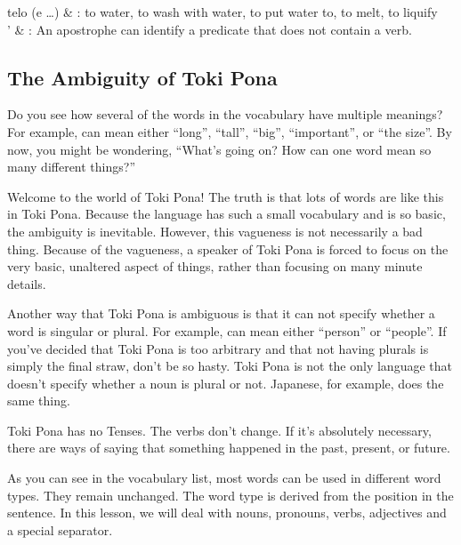 \begin{vocabularytable}
    telo (e \dots{})   & : to water, to wash with water, to put water to, to melt, to liquify                                                                                    \\
    \wordrule %
    '                  & : An apostrophe can identify a predicate that does not contain a verb.                                                                                       \\
\end{vocabularytable}

\subsection*{The Ambiguity of Toki Pona}
Do you see how several of the words in the vocabulary have multiple meanings?
For example,  can mean either ``long'', ``tall'', ``big'', ``important'', or ``the size''.
By now, you might be wondering, ``What's going on? How can one word mean so many different things?''

Welcome to the world of Toki Pona!
The truth is that lots of words are like this in Toki Pona.
Because the language has such a small vocabulary and is so basic, the ambiguity is inevitable.
However, this vagueness is not necessarily a bad thing. Because of the vagueness, a speaker of Toki Pona is forced to focus on the very basic, unaltered aspect of things, rather than focusing on many minute details.

Another way that Toki Pona is ambiguous is that it can not specify whether a word is singular or plural.
For example,  can mean either ``person'' or ``people''.
If you've decided that Toki Pona is too arbitrary and that not having plurals is simply the final straw, don't be so hasty.
Toki Pona is not the only language that doesn't specify whether a noun is plural or not.
Japanese, for example, does the same thing.

Toki Pona has no Tenses.
The verbs don't change.
If it's absolutely necessary, there are ways of saying that something happened in the past, present, or future.

As you can see in the vocabulary list, most words can be used in different word types.
They remain unchanged.
The word type is derived from the position in the sentence.
In this lesson, we will deal with nouns, pronouns, verbs, adjectives and a special separator.

